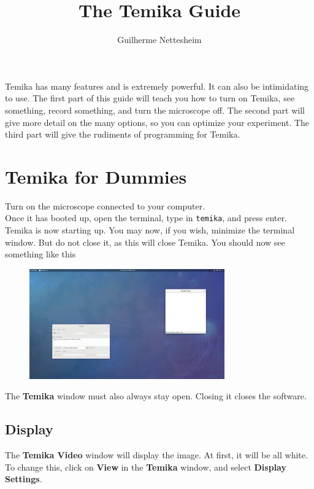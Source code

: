 \documentclass{article}
\author{Guilherme Nettesheim}
\title{The Temika Guide}
\begin{document}
\maketitle

Temika has many features and is extremely powerful. It can also be intimidating to use. The first part of this guide will teach you how to turn on Temika, see something, record something, and turn the microscope off. The second part will give more detail on the many options, so you can optimize your experiment. The third part will give the rudiments of programming for Temika.

\section{Temika for Dummies}

Turn on the microscope connected to your computer.
\\
Once it has booted up, open the terminal, type in \verb|temika|, and press enter.
\\
Temika is now starting up. You may now, if you wish, minimize the terminal window. But do not close it, as this will close Temika. You should now see something like this\\

\begin{figure}[h]
\centering
\includegraphics[width=0.75\textwidth]{just_opened}
\end{figure}

The \textbf{Temika} window must also always stay open. Closing it closes the software.\\

\newpage

\subsection{Display}

The \textbf{Temika Video} window will display the image. At first, it will be all white. To change this, click on \textbf{View} in the \textbf{Temika} window, and select \textbf{Display Settings}.
\end{document}
